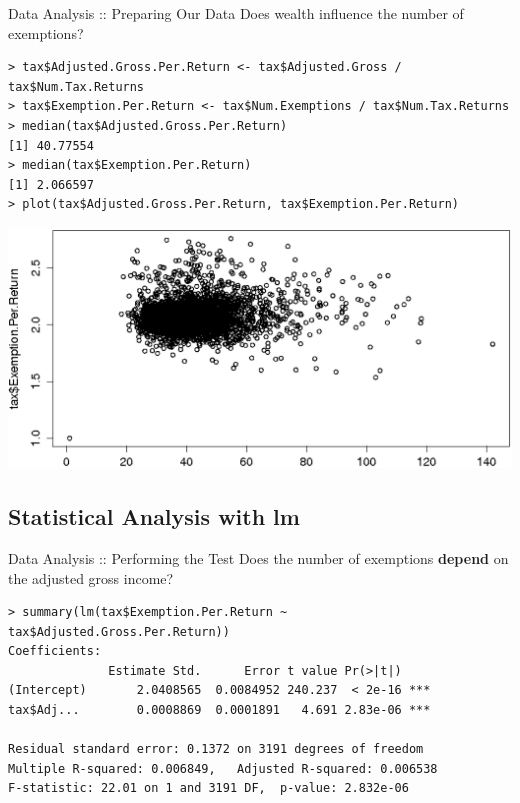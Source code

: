 \documentclass{beamer}
\begin{document}
\begin{frame}[fragile]{Data Analysis :: Preparing Our Data}
Does wealth influence the number of exemptions?

\begin{footnotesize}
\begin{verbatim}
> tax$Adjusted.Gross.Per.Return <- tax$Adjusted.Gross / tax$Num.Tax.Returns
> tax$Exemption.Per.Return <- tax$Num.Exemptions / tax$Num.Tax.Returns
> median(tax$Adjusted.Gross.Per.Return)
[1] 40.77554
> median(tax$Exemption.Per.Return)
[1] 2.066597
> plot(tax$Adjusted.Gross.Per.Return, tax$Exemption.Per.Return)
\end{verbatim}
\end{footnotesize}

\includegraphics[scale=0.24]{income_v_exemptions.eps}

\end{frame}

\subsection{Statistical Analysis with lm}

\begin{frame}[fragile]{Data Analysis :: Performing the Test}
Does the number of exemptions \textbf{depend} on the adjusted gross income?

\begin{footnotesize}
\begin{verbatim}
> summary(lm(tax$Exemption.Per.Return ~ tax$Adjusted.Gross.Per.Return))
Coefficients:
              Estimate Std.      Error t value Pr(>|t|)    
(Intercept)       2.0408565  0.0084952 240.237  < 2e-16 ***
tax$Adj...        0.0008869  0.0001891   4.691 2.83e-06 ***

Residual standard error: 0.1372 on 3191 degrees of freedom
Multiple R-squared: 0.006849,   Adjusted R-squared: 0.006538 
F-statistic: 22.01 on 1 and 3191 DF,  p-value: 2.832e-06
\end{verbatim}
\end{footnotesize}

\end{frame}
\end{document}
